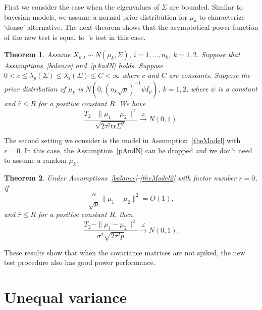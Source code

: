 \documentclass[review]{elsarticle}
\theoremstyle{plain}
\newtheorem{theorem}{\quad\quad Theorem}
\theoremstyle{definition}
\theoremstyle{remark}
\begin{document}
First we consider the case  when the eigenvalues of $\Sigma$ are bounded.
Similar to bayesian models, we assume a normal prior distribution for $\mu_k$ to characterize `dense' alternative.
The next theorem shows that the asymptotical power function of the new test is  equal to~\cite{Chen2010A}'s test in this case.


\begin{theorem}\label{sameTheorem}
   Assume $X_{k,i}\sim N(\mu_k,\Sigma)$,  $i=1,\ldots,n_k$, $k=1,2$.
    Suppose that Assumptions~\ref{balance} and~\ref{pAndN} holds. Suppose $0<c\leq\lambda_p(\Sigma)\leq\lambda_1(\Sigma)\leq C<\infty$ where $c$ and $C$ are constants.
    Suppose the prior distribution of $\mu_k$ is $N(0,{(n_k\sqrt{p})}^{-1}\psi I_p)$, $k=1,2$, where $\psi$ is a constant and  $\hat{r}\leq R$ for a positive constant $R$.
    We have
\begin{equation*}
    \frac{T_2-\|\mu_1-\mu_2\|^2}{\sqrt{2\tau^2 \mathrm{tr}\Sigma^2}} \xrightarrow{\mathcal{L}} N(0,1).
\end{equation*}
\end{theorem}

The second setting we consider is the model in Assumption~\ref{theModel} with $r=0$.
In this case, the Assumption~\ref{pAndN} can be dropped and we don't need to assume a random $\mu_k$.

\begin{theorem}\label{sameTheorem2}
    Under Assumptions~\ref{balance}-\ref{theModel2} with factor number $r=0$, if
    $$
    \frac{n}{\sqrt{p}}\|\mu_1-\mu_2\|^2=O(1),
    $$
    and $\hat{r}\leq R$ for a positive constant $R$,
    then
    $$
    \frac{T_2-\|\mu_1-\mu_2\|^2}{\sigma^2\sqrt{2\tau^2 p}}\xrightarrow{\mathcal{L}} N(0,1).
    $$
\end{theorem}
These results show that when the covariance matrices are not spiked, the new test procedure also has good power performance.


\section{Unequal variance}
\end{document}
